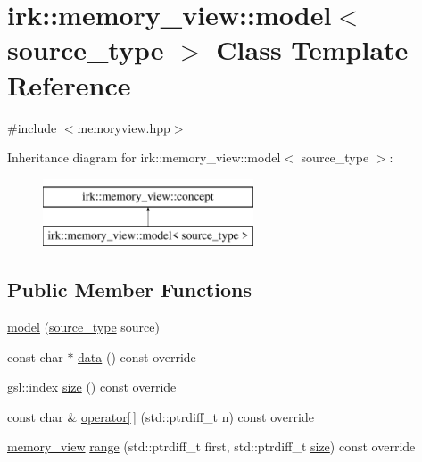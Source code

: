 \hypertarget{classirk_1_1memory__view_1_1model}{}\section{irk\+:\+:memory\+\_\+view\+:\+:model$<$ source\+\_\+type $>$ Class Template Reference}
\label{classirk_1_1memory__view_1_1model}


{\ttfamily \#include $<$memoryview.\+hpp$>$}

Inheritance diagram for irk\+:\+:memory\+\_\+view\+:\+:model$<$ source\+\_\+type $>$\+:\begin{figure}[H]
\begin{center}
\leavevmode
\includegraphics[height=2.000000cm]{classirk_1_1memory__view_1_1model}
\end{center}
\end{figure}
\subsection*{Public Member Functions}
\begin{DoxyCompactItemize}
\item 
\mbox{\hyperlink{classirk_1_1memory__view_1_1model_a47843c84f96ecb25ce8c81ce47c214b4}{model}} (\mbox{\hyperlink{irk-score_8cpp_a73f57f67fb1e33bdbfd80bfba2fc9ffe}{source\+\_\+type}} source)
\item 
const char $\ast$ \mbox{\hyperlink{classirk_1_1memory__view_1_1model_a5a7c432c460f99bd8b78c29ef6d44009}{data}} () const override
\item 
gsl\+::index \mbox{\hyperlink{classirk_1_1memory__view_1_1model_a88bdaaf00f71b733bb67ea912ed78251}{size}} () const override
\item 
const char \& \mbox{\hyperlink{classirk_1_1memory__view_1_1model_a8c54be09ffb8bd159e375d14a6f8218b}{operator\mbox{[}$\,$\mbox{]}}} (std\+::ptrdiff\+\_\+t n) const override
\item 
\mbox{\hyperlink{classirk_1_1memory__view}{memory\+\_\+view}} \mbox{\hyperlink{classirk_1_1memory__view_1_1model_aed67f637a1f0e7e31dcf039074861724}{range}} (std\+::ptrdiff\+\_\+t first, std\+::ptrdiff\+\_\+t \mbox{\hyperlink{classirk_1_1memory__view_1_1model_a88bdaaf00f71b733bb67ea912ed78251}{size}}) const override
\end{DoxyCompactItemize}


